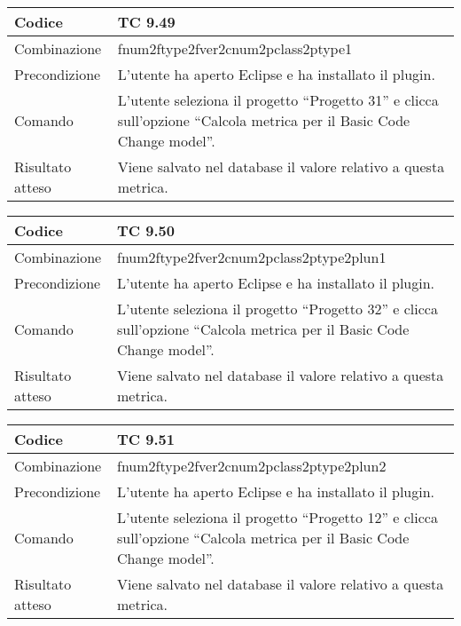 \begin{table}[ht]
\begin{tabular}{|p{3cm}|p{9cm}|}
\hline
\cellcolor{lightgray}Codice				& TC 9.49								\\
\hline
\cellcolor{lightgray}Combinazione		& fnum2ftype2fver2cnum2pclass2ptype1									\\
\hline
\cellcolor{lightgray}Precondizione		& L'utente ha aperto Eclipse e ha installato il plugin.		\\
\hline
\cellcolor{lightgray}Comando			& L'utente seleziona il progetto ``Progetto 31''  e clicca sull'opzione ``Calcola metrica per il Basic Code Change model''.	\\
\hline
\cellcolor{lightgray}Risultato atteso	& Viene salvato nel database il valore relativo a questa metrica.\\
\hline
\end{tabular}
\end{table}

\begin{table}[ht]
\begin{tabular}{|p{3cm}|p{9cm}|}
\hline
\cellcolor{lightgray}Codice				& TC 9.50								\\
\hline
\cellcolor{lightgray}Combinazione		& fnum2ftype2fver2cnum2pclass2ptype2plun1									\\
\hline
\cellcolor{lightgray}Precondizione		& L'utente ha aperto Eclipse e ha installato il plugin.		\\
\hline
\cellcolor{lightgray}Comando			& L'utente seleziona il progetto ``Progetto 32''  e clicca sull'opzione ``Calcola metrica per il Basic Code Change model''.	\\
\hline
\cellcolor{lightgray}Risultato atteso	& Viene salvato nel database il valore relativo a questa metrica.\\
\hline
\end{tabular}
\end{table}

\begin{table}[ht]
\begin{tabular}{|p{3cm}|p{9cm}|}
\hline
\cellcolor{lightgray}Codice				& TC 9.51								\\
\hline
\cellcolor{lightgray}Combinazione		& fnum2ftype2fver2cnum2pclass2ptype2plun2									\\
\hline
\cellcolor{lightgray}Precondizione		& L'utente ha aperto Eclipse e ha installato il plugin.		\\
\hline
\cellcolor{lightgray}Comando			& L'utente seleziona il progetto ``Progetto 12''  e clicca sull'opzione ``Calcola metrica per il Basic Code Change model''.	\\
\hline
\cellcolor{lightgray}Risultato atteso	& Viene salvato nel database il valore relativo a questa metrica.\\
\hline
\end{tabular}
\end{table}

